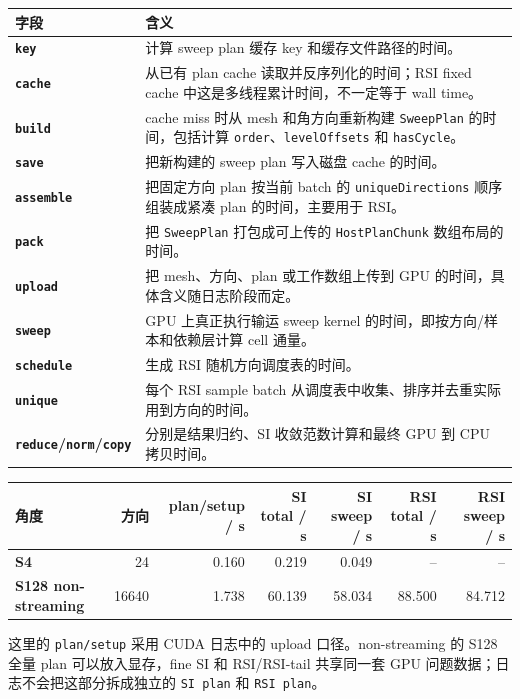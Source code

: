 \documentclass[10pt]{article}
\newcommand{\subsect}[1]{\vspace{2mm}{\sffamily\large\bfseries #1}\par}
\newcommand{\code}[1]{\texttt{#1}}
\begin{document}
\begin{tabularx}{\linewidth}{>{\bfseries}l X}
\toprule
字段 & 含义\\
\midrule
\code{key} & 计算 sweep plan 缓存 key 和缓存文件路径的时间。\\
\code{cache} & 从已有 plan cache 读取并反序列化的时间；RSI fixed cache 中这是多线程累计时间，不一定等于 wall time。\\
\code{build} & cache miss 时从 mesh 和角方向重新构建 \code{SweepPlan} 的时间，包括计算 \code{order}、\code{levelOffsets} 和 \code{hasCycle}。\\
\code{save} & 把新构建的 sweep plan 写入磁盘 cache 的时间。\\
\code{assemble} & 把固定方向 plan 按当前 batch 的 \code{uniqueDirections} 顺序组装成紧凑 plan 的时间，主要用于 RSI。\\
\code{pack} & 把 \code{SweepPlan} 打包成可上传的 \code{HostPlanChunk} 数组布局的时间。\\
\code{upload} & 把 mesh、方向、plan 或工作数组上传到 GPU 的时间，具体含义随日志阶段而定。\\
\code{sweep} & GPU 上真正执行输运 sweep kernel 的时间，即按方向/样本和依赖层计算 cell 通量。\\
\code{schedule} & 生成 RSI 随机方向调度表的时间。\\
\code{unique} & 每个 RSI sample batch 从调度表中收集、排序并去重实际用到方向的时间。\\
\code{reduce}/\code{norm}/\code{copy} & 分别是结果归约、SI 收敛范数计算和最终 GPU 到 CPU 拷贝时间。\\
\bottomrule
\end{tabularx}

\subsect{8.1 30k non-streaming 计时}

\begin{tabularx}{\linewidth}{>{\bfseries}l r r r r r r}
\toprule
角度 & 方向 & plan/setup / s & SI total / s & SI sweep / s & RSI total / s & RSI sweep / s\\
\midrule
\rowcolor{softrow}
S4 & 24 & 0.160 & 0.219 & 0.049 & -- & --\\
S128 non-streaming & 16640 & 1.738 & 60.139 & 58.034 & 88.500 & 84.712\\
\bottomrule
\end{tabularx}

这里的 \code{plan/setup} 采用 CUDA 日志中的 upload 口径。non-streaming 的 S128 全量 plan 可以放入显存，fine SI 和 RSI/RSI-tail 共享同一套 GPU 问题数据；日志不会把这部分拆成独立的 \code{SI plan} 和 \code{RSI plan}。
\end{document}

